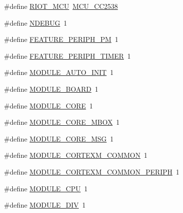 \begin{DoxyCompactItemize}
\item 
\#define \hyperlink{openmote-cc2538_2riotbuild_2riotbuild_8h_a9cc0edbe0977ef6d2d755907cf89fc8b}{R\+I\+O\+T\+\_\+\+M\+CU}~\hyperlink{openmote-cc2538_2riotbuild_2riotbuild_8h_ac81d7d4ef604e0f03ff7a9769d1fcd64}{M\+C\+U\+\_\+\+C\+C2538}
\item 
\#define \hyperlink{openmote-cc2538_2riotbuild_2riotbuild_8h_a8de3ed741dadc9c979a4ff17c0a9116e}{N\+D\+E\+B\+UG}~1
\item 
\#define \hyperlink{openmote-cc2538_2riotbuild_2riotbuild_8h_ae9efeef743cdcca3455bbede14b08c3b}{F\+E\+A\+T\+U\+R\+E\+\_\+\+P\+E\+R\+I\+P\+H\+\_\+\+PM}~1
\item 
\#define \hyperlink{openmote-cc2538_2riotbuild_2riotbuild_8h_a698bb4ff5b47f06e9b814bfd42a603f5}{F\+E\+A\+T\+U\+R\+E\+\_\+\+P\+E\+R\+I\+P\+H\+\_\+\+T\+I\+M\+ER}~1
\item 
\#define \hyperlink{openmote-cc2538_2riotbuild_2riotbuild_8h_aae676bb7cb1fefcda8c6da9a5c4c1fef}{M\+O\+D\+U\+L\+E\+\_\+\+A\+U\+T\+O\+\_\+\+I\+N\+IT}~1
\item 
\#define \hyperlink{openmote-cc2538_2riotbuild_2riotbuild_8h_a7c0456ff23cf1bbf144aacee58f24b21}{M\+O\+D\+U\+L\+E\+\_\+\+B\+O\+A\+RD}~1
\item 
\#define \hyperlink{openmote-cc2538_2riotbuild_2riotbuild_8h_af96ab173b789ac144161d4a908e70618}{M\+O\+D\+U\+L\+E\+\_\+\+C\+O\+RE}~1
\item 
\#define \hyperlink{openmote-cc2538_2riotbuild_2riotbuild_8h_a0b3f205697149ad22aeb557d63a92c46}{M\+O\+D\+U\+L\+E\+\_\+\+C\+O\+R\+E\+\_\+\+M\+B\+OX}~1
\item 
\#define \hyperlink{openmote-cc2538_2riotbuild_2riotbuild_8h_adefe92834c721069ed7fa76174f2460c}{M\+O\+D\+U\+L\+E\+\_\+\+C\+O\+R\+E\+\_\+\+M\+SG}~1
\item 
\#define \hyperlink{openmote-cc2538_2riotbuild_2riotbuild_8h_adb1c956465b6af1b4be6390c557990ef}{M\+O\+D\+U\+L\+E\+\_\+\+C\+O\+R\+T\+E\+X\+M\+\_\+\+C\+O\+M\+M\+ON}~1
\item 
\#define \hyperlink{openmote-cc2538_2riotbuild_2riotbuild_8h_a12ba2f3e3a99192cb4ed75913daf82e3}{M\+O\+D\+U\+L\+E\+\_\+\+C\+O\+R\+T\+E\+X\+M\+\_\+\+C\+O\+M\+M\+O\+N\+\_\+\+P\+E\+R\+I\+PH}~1
\item 
\#define \hyperlink{openmote-cc2538_2riotbuild_2riotbuild_8h_ac17f41bf714940e70c59f307da4928d1}{M\+O\+D\+U\+L\+E\+\_\+\+C\+PU}~1
\item 
\#define \hyperlink{openmote-cc2538_2riotbuild_2riotbuild_8h_a0fbb381af94195478e4ad4ce882537d6}{M\+O\+D\+U\+L\+E\+\_\+\+D\+IV}~1
\item 

\end{DoxyCompactItemize}
